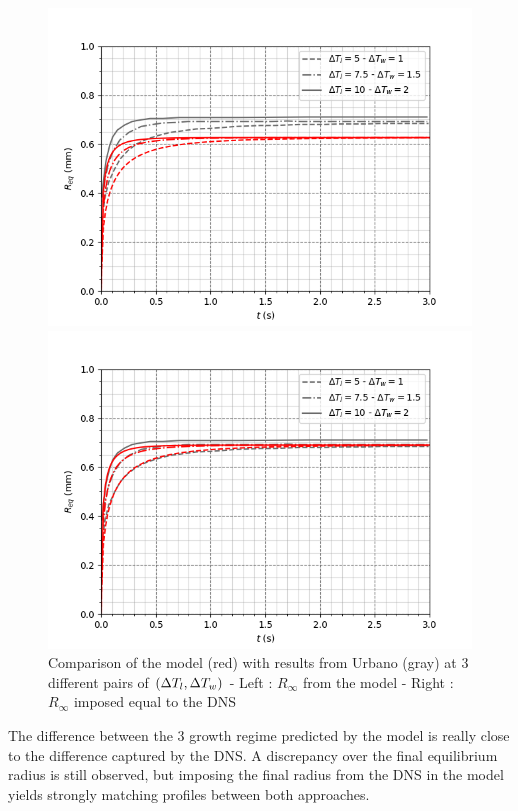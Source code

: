 \begin{figure}[h!]
\begin{multicols}{2}
\includegraphics[width=1.0\linewidth]{img/tg/comp_Urbano.png}

\includegraphics[width=1.0\linewidth]{img/tg/comp_Urbano_fixed_Req.png}
\end{multicols}
\caption{Comparison of the model (red) with results from Urbano \etal (gray) at 3 different pairs of $\left( \Delta T_{l}, \Delta T_{w} \right)$ - Left : $R_{\infty}$ from the model - Right : $R_{\infty}$ imposed equal to the DNS}
\label{fig:growth_DNS_regime}
\end{figure}


The difference between the 3 growth regime predicted by the model is really close to the difference captured by the DNS. A discrepancy over the final equilibrium radius is still observed, but imposing the final radius from the DNS in the model yields strongly matching profiles between both approaches. 

